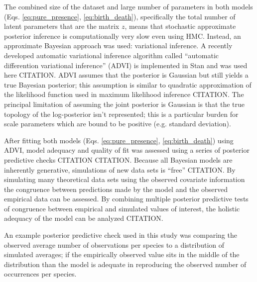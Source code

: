\documentclass[12pt,letterpaper]{article}
\begin{document}

The combined size of the dataset and large number of parameters in both models (Eqs. \ref{eq:pure_presence}, \ref{eq:birth_death}), specifically the total number of latent parameters that are the matrix \(z\), means that stochastic approximate posterior inference is computationally very slow even using HMC. Instead, an approximate Bayesian approach was used: variational inference. A recently developed automatic variational inference algorithm called ``automatic differention variational inference'' (ADVI) is implemented in Stan and was used here CITATION. ADVI assumes that the posterior is Gaussian but still yields a true Bayesian posterior; this assumption is similar to quadratic approximation of the likelihood function used in maximum likelihood inference CITATION. The principal limitation of assuming the joint posterior is Gaussian is that the true topology of the log-posterior isn't represented; this is a particular burden for scale parameters which are bound to be positive (e.g. standard deviation).

After fitting both models (Eqs. \ref{eq:pure_presence}, \ref{eq:birth_death}) using ADVI, model adequacy and quality of fit was assessed using a series of posterior predictive checks CITATION CITATION. Because all Bayesian models are inherently generative, simulations of new data sets is ``free'' CITATION. By simulating many theoretical data sets using the observed covariate information the congruence between predictions made by the model and the observed empirical data can be assessed. By combining multiple posterior predictive tests of congruence between empirical and simulated values of interest, the holistic adequacy of the model can be analyzed CITATION.

An example posterior predictive check used in this study was comparing the observed average number of observations per species to a distribution of simulated averages; if the empirically observed value sits in the middle of the distribution than the model is adequate in reproducing the observed number of occurrences per species. 



\end{document}
